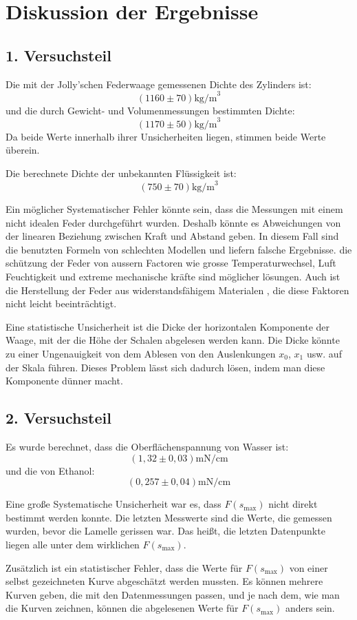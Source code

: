 \documentclass[11pt,a4paper]{article} %
\begin{document}
\section{Diskussion der Ergebnisse}
\subsection{1. Versuchsteil}
Die mit der Jolly'schen Federwaage gemessenen Dichte des Zylinders ist:
$$(1160\pm 70)\textrm{kg/m}^3$$
und die durch Gewicht- und Volumenmessungen bestimmten Dichte:
$$(1170\pm 50)\textrm{kg/m}^3$$
Da beide Werte innerhalb ihrer Unsicherheiten liegen, stimmen beide Werte überein. 

Die berechnete Dichte der unbekannten Flüssigkeit ist:
$$(750 \pm 70) \textrm{kg/m}^3$$

Ein möglicher Systematischer Fehler könnte sein, dass die Messungen mit einem nicht idealen Feder durchgeführt wurden. Deshalb könnte es Abweichungen von der linearen Beziehung zwischen Kraft und Abstand geben. In diesem Fall sind die benutzten Formeln von schlechten Modellen und liefern falsche Ergebnisse. 
die sch\"{u}tzung der Feder von aussern Factoren wie grosse 
Temperaturwechsel, Luft Feuchtigkeit und extreme mechanische kr\"{a}fte sind m\"{o}glicher l\"{o}sungen. Auch ist die Herstellung der Feder aus widerstandsfähigem Materialen , die diese Faktoren nicht leicht beeinträchtigt.

Eine statistische Unsicherheit ist die Dicke der horizontalen Komponente der Waage, mit der die Höhe der Schalen abgelesen werden kann. Die Dicke könnte zu einer Ungenauigkeit von dem Ablesen von den Auslenkungen $x_0$, $x_1$ usw. auf der Skala führen. Dieses Problem lässt sich dadurch lösen, indem man diese Komponente dünner macht. 

\subsection{2. Versuchsteil}
Es wurde berechnet, dass die Oberflächenspannung von Wasser ist:
$$(1,32\pm 0,03) \textrm{mN/cm}$$
und die von Ethanol:
$$(0,257 \pm 0,04) \textrm{mN/cm}$$

Eine große Systematische Unsicherheit war es, dass  $F(s_\textrm{max})$ nicht direkt bestimmt werden konnte. Die letzten Messwerte sind die Werte, die gemessen wurden, bevor die Lamelle gerissen war. Das heißt, die letzten Datenpunkte liegen alle unter dem wirklichen $F(s_\text{max})$. 

Zusätzlich ist ein statistischer Fehler, dass die Werte für $F(s_\textrm{max})$ von einer selbst gezeichneten Kurve abgeschätzt werden mussten. Es können mehrere Kurven geben, die mit den Datenmessungen passen, und je nach dem, wie man die Kurven zeichnen, können die abgelesenen Werte für $F(s_\textrm{max})$ anders sein. 
\end{document}
